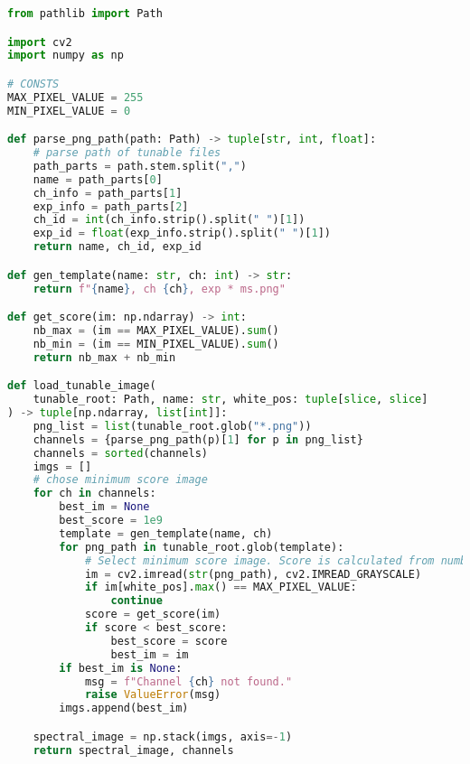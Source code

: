 \begin{lstlisting}[language=python, caption=Load Tunable Light Sources images, label={code:load-tunable}]
from pathlib import Path

import cv2
import numpy as np

# CONSTS
MAX_PIXEL_VALUE = 255
MIN_PIXEL_VALUE = 0

def parse_png_path(path: Path) -> tuple[str, int, float]:
    # parse path of tunable files
    path_parts = path.stem.split(",")
    name = path_parts[0]
    ch_info = path_parts[1]
    exp_info = path_parts[2]
    ch_id = int(ch_info.strip().split(" ")[1])
    exp_id = float(exp_info.strip().split(" ")[1])
    return name, ch_id, exp_id

def gen_template(name: str, ch: int) -> str:
    return f"{name}, ch {ch}, exp * ms.png"

def get_score(im: np.ndarray) -> int:
    nb_max = (im == MAX_PIXEL_VALUE).sum()
    nb_min = (im == MIN_PIXEL_VALUE).sum()
    return nb_max + nb_min

def load_tunable_image(
    tunable_root: Path, name: str, white_pos: tuple[slice, slice]
) -> tuple[np.ndarray, list[int]]:
    png_list = list(tunable_root.glob("*.png"))
    channels = {parse_png_path(p)[1] for p in png_list}
    channels = sorted(channels)
    imgs = []
    # chose minimum score image
    for ch in channels:
        best_im = None
        best_score = 1e9
        template = gen_template(name, ch)
        for png_path in tunable_root.glob(template):
            # Select minimum score image. Score is calculated from number of unvalid pixels
            im = cv2.imread(str(png_path), cv2.IMREAD_GRAYSCALE)
            if im[white_pos].max() == MAX_PIXEL_VALUE:
                continue
            score = get_score(im)
            if score < best_score:
                best_score = score
                best_im = im
        if best_im is None:
            msg = f"Channel {ch} not found."
            raise ValueError(msg)
        imgs.append(best_im)

    spectral_image = np.stack(imgs, axis=-1)
    return spectral_image, channels

\end{lstlisting}
